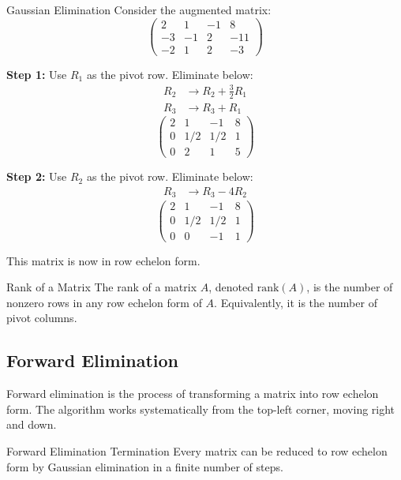 \documentclass[12pt,a4paper]{article}
\newcommand{\rank}{\text{rank}}
\begin{document}
	\begin{example}{Gaussian Elimination}
		Consider the augmented matrix:
		\[
		\left(\begin{array}{ccc|c}
			2 & 1 & -1 & 8 \\
			-3 & -1 & 2 & -11 \\
			-2 & 1 & 2 & -3
		\end{array}\right)
		\]
		
		\textbf{Step 1:} Use $R_1$ as the pivot row. Eliminate below:
		\begin{align*}
			R_2 &\to R_2 + \tfrac{3}{2}R_1 \\
			R_3 &\to R_3 + R_1
		\end{align*}
		\[
		\left(\begin{array}{ccc|c}
			2 & 1 & -1 & 8 \\
			0 & 1/2 & 1/2 & 1 \\
			0 & 2 & 1 & 5
		\end{array}\right)
		\]
		
		\textbf{Step 2:} Use $R_2$ as the pivot row. Eliminate below:
		\begin{align*}
			R_3 &\to R_3 - 4R_2
		\end{align*}
		\[
		\left(\begin{array}{ccc|c}
			2 & 1 & -1 & 8 \\
			0 & 1/2 & 1/2 & 1 \\
			0 & 0 & -1 & 1
		\end{array}\right)
		\]
		
		This matrix is now in row echelon form.
	\end{example}
	
	\begin{proposition}{Rank of a Matrix}
		The rank of a matrix $A$, denoted $\rank(A)$, is the number of nonzero rows in any row echelon form of $A$. Equivalently, it is the number of pivot columns.
	\end{proposition}
	
	\subsection{Forward Elimination}
	
	Forward elimination is the process of transforming a matrix into row echelon form. The algorithm works systematically from the top-left corner, moving right and down.
	
	\begin{theorem}{Forward Elimination Termination}
		Every matrix can be reduced to row echelon form by Gaussian elimination in a finite number of steps.
	\end{theorem}
	
\end{document}
